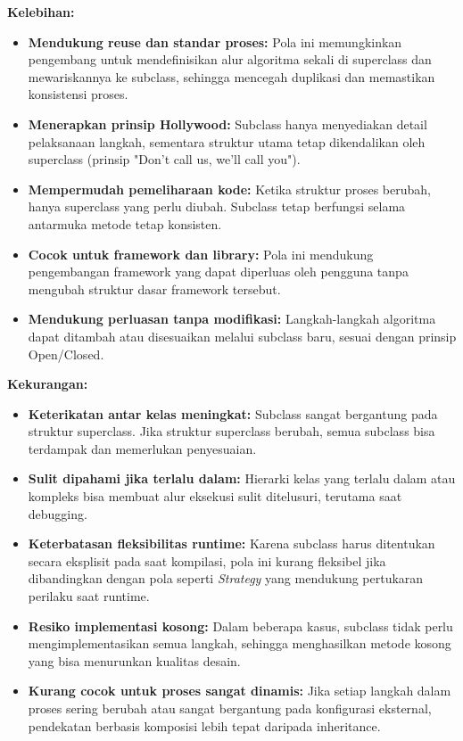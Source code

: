 \textbf{Kelebihan:}
\begin{itemize}
	\item \textbf{Mendukung reuse dan standar proses:} Pola ini memungkinkan pengembang untuk mendefinisikan alur algoritma sekali di superclass dan mewariskannya ke subclass, sehingga mencegah duplikasi dan memastikan konsistensi proses.
	
	\item \textbf{Menerapkan prinsip Hollywood:} Subclass hanya menyediakan detail pelaksanaan langkah, sementara struktur utama tetap dikendalikan oleh superclass (prinsip "Don't call us, we'll call you").
	
	\item \textbf{Mempermudah pemeliharaan kode:} Ketika struktur proses berubah, hanya superclass yang perlu diubah. Subclass tetap berfungsi selama antarmuka metode tetap konsisten.
	
	\item \textbf{Cocok untuk framework dan library:} Pola ini mendukung pengembangan framework yang dapat diperluas oleh pengguna tanpa mengubah struktur dasar framework tersebut.
	
	\item \textbf{Mendukung perluasan tanpa modifikasi:} Langkah-langkah algoritma dapat ditambah atau disesuaikan melalui subclass baru, sesuai dengan prinsip Open/Closed.
\end{itemize}

\textbf{Kekurangan:}
\begin{itemize}
	\item \textbf{Keterikatan antar kelas meningkat:} Subclass sangat bergantung pada struktur superclass. Jika struktur superclass berubah, semua subclass bisa terdampak dan memerlukan penyesuaian.
	
	\item \textbf{Sulit dipahami jika terlalu dalam:} Hierarki kelas yang terlalu dalam atau kompleks bisa membuat alur eksekusi sulit ditelusuri, terutama saat debugging.
	
	\item \textbf{Keterbatasan fleksibilitas runtime:} Karena subclass harus ditentukan secara eksplisit pada saat kompilasi, pola ini kurang fleksibel jika dibandingkan dengan pola seperti \textit{Strategy} yang mendukung pertukaran perilaku saat runtime.
	
	\item \textbf{Resiko implementasi kosong:} Dalam beberapa kasus, subclass tidak perlu mengimplementasikan semua langkah, sehingga menghasilkan metode kosong yang bisa menurunkan kualitas desain.
	
	\item \textbf{Kurang cocok untuk proses sangat dinamis:} Jika setiap langkah dalam proses sering berubah atau sangat bergantung pada konfigurasi eksternal, pendekatan berbasis komposisi lebih tepat daripada inheritance.
\end{itemize}

